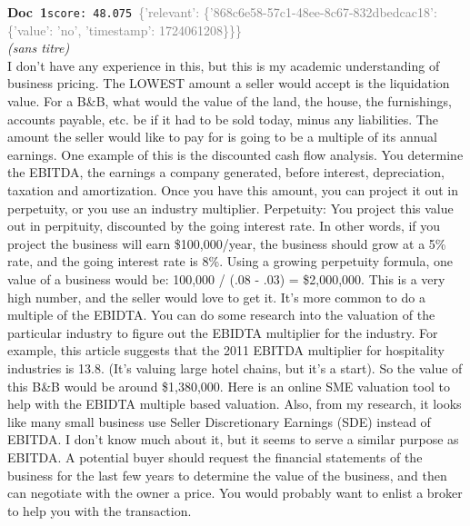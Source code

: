 \documentclass[a4paper,11pt]{article}
\begin{document}
\begin{docenv}
{\footnotesize\textcolor{doccolor}{\textbf{Doc~1}}}\hfill{\tiny\texttt{score:~48.075}}\ {\tiny\textcolor{gray}{\{'relevant': \{'868c6e58-57c1-48ee-8c67-832dbedcac18': \{'value': 'no', 'timestamp': 1724061208\}\}\}}}\\[3pt]
{\small\textit{(sans titre)}}\\[2pt]
\vspace{2pt}
{\footnotesize 
I don't have any experience in this, but this is my academic understanding of business pricing.  The LOWEST amount a seller would accept is the liquidation value. For a B\&B, what would the value of the land, the house, the furnishings, accounts payable, etc. be if it had to be sold today, minus any liabilities.  The amount the seller would like to pay for is going to be a multiple of its annual earnings. One example of this is the discounted cash flow analysis. You determine the EBITDA, the earnings a company generated, before interest,  depreciation, taxation and amortization.  Once you have this amount, you can project it out in perpetuity, or you use an industry multiplier.  Perpetuity:  You project this value out in perpituity, discounted by the going interest rate. In other words, if you project the business will earn \$100,000/year, the business should grow at a 5\% rate, and the going interest rate is 8\%. Using a growing perpetuity formula, one value of a business would be: 100,000 / (.08 - .03) = \$2,000,000.  This is a very high number, and the seller would love to get it.  It's more common to do a multiple of the EBIDTA. You can do some research into the valuation of the particular industry to figure out the EBIDTA multiplier for the industry. For example, this article suggests that the 2011 EBITDA multiplier for hospitality industries is 13.8. (It's valuing large hotel chains, but it's a start). So the value of this B\&B would be around \$1,380,000. Here is an online SME valuation tool to help with the EBIDTA multiple based valuation. Also, from my research, it looks like many small business use Seller Discretionary Earnings  (SDE) instead of EBITDA. I don't know much about it, but it seems to serve a similar purpose as EBITDA.  A potential buyer should request the financial statements of the business for the last few years to determine the value of the business, and then can negotiate with the owner a price. You would probably want to enlist a broker to help you with the transaction.}
\end{docenv}
\end{document}
